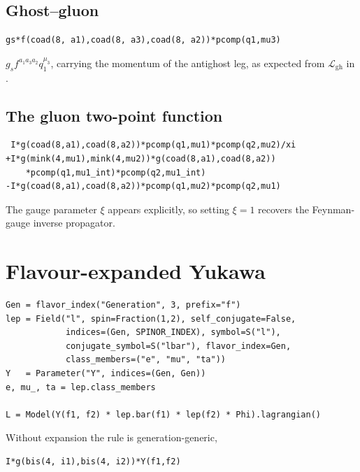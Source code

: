 \subsection*{Ghost--gluon}

\begin{verbatim}
gs*f(coad(8, a1),coad(8, a3),coad(8, a2))*pcomp(q1,mu3)
\end{verbatim}

\noindent $g_s f^{a_1 a_3 a_2} q_1^{\mu_3}$, carrying the momentum of the
antighost leg, as expected from $\mathcal{L}_{\mathrm{gh}}$ in
.

\subsection*{The gluon two-point function}

\begin{verbatim}
 I*g(coad(8,a1),coad(8,a2))*pcomp(q1,mu1)*pcomp(q2,mu2)/xi
+I*g(mink(4,mu1),mink(4,mu2))*g(coad(8,a1),coad(8,a2))
    *pcomp(q1,mu1_int)*pcomp(q2,mu1_int)
-I*g(coad(8,a1),coad(8,a2))*pcomp(q1,mu2)*pcomp(q2,mu1)
\end{verbatim}

\noindent The gauge parameter $\xi$ appears explicitly, so setting $\xi = 1$
recovers the Feynman-gauge inverse propagator.

\section{Flavour-expanded Yukawa}

\begin{verbatim}
Gen = flavor_index("Generation", 3, prefix="f")
lep = Field("l", spin=Fraction(1,2), self_conjugate=False,
            indices=(Gen, SPINOR_INDEX), symbol=S("l"),
            conjugate_symbol=S("lbar"), flavor_index=Gen,
            class_members=("e", "mu", "ta"))
Y   = Parameter("Y", indices=(Gen, Gen))
e, mu_, ta = lep.class_members

L = Model(Y(f1, f2) * lep.bar(f1) * lep(f2) * Phi).lagrangian()
\end{verbatim}

\noindent Without expansion the rule is generation-generic,

\begin{verbatim}
I*g(bis(4, i1),bis(4, i2))*Y(f1,f2)
\end{verbatim}

